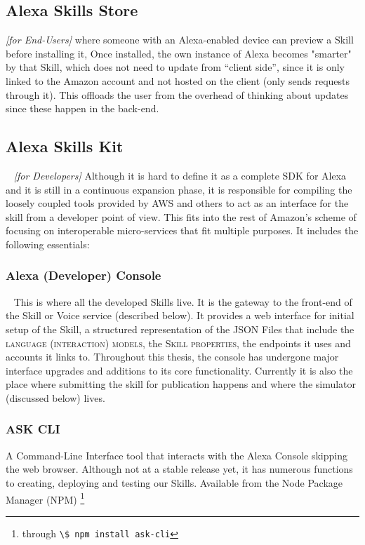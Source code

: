 	
	\subsection*{Alexa Skills Store} \textit{[for End-Users]} where someone with an Alexa-enabled device can preview a Skill before installing it, %
	Once installed, the own instance of Alexa becomes "smarter" by that Skill, which does not need to update from ``client side'', since it is only linked to the Amazon account and not hosted on the client (only sends requests through it).  %
	This offloads the user from the overhead of %
	thinking about updates since these happen in the back-end. 
	
	
	\subsection*{Alexa Skills Kit}~\label{ask:def} \textit{[for Developers]} Although it is hard to define it as a complete SDK for Alexa and it is still in a continuous expansion phase, it is responsible for compiling the loosely coupled tools provided by AWS and others to act as an interface for the skill from a developer point of view. This fits into the rest of Amazon's scheme of focusing on interoperable micro-services that fit multiple purposes. It includes the following essentials:
	
	
		\subsubsection*{Alexa (Developer) Console}~\label{ask:devconsole} This is where all the developed Skills live. It is the gateway to the front-end of the Skill or Voice service (described below). It provides a web interface for initial setup of the Skill, a structured representation of the JSON Files that include the \textsc{language (interaction) models}, the \textsc{Skill properties}, the endpoints it uses and accounts it links to. 
		Throughout this thesis, the console has undergone major interface upgrades and additions to its core functionality. Currently it is also the place where submitting the skill for publication happens and where the simulator (discussed below) lives.
		
		\subsubsection*{ASK CLI} %
		A Command-Line Interface tool that interacts with the Alexa Console skipping the web browser. %
		Although not at a stable release yet, it has numerous functions to creating, deploying and testing our Skills. %
		Available from the Node Package Manager (NPM) \footnote{
			through \lstinline|\$ npm install ask-cli| }
		

